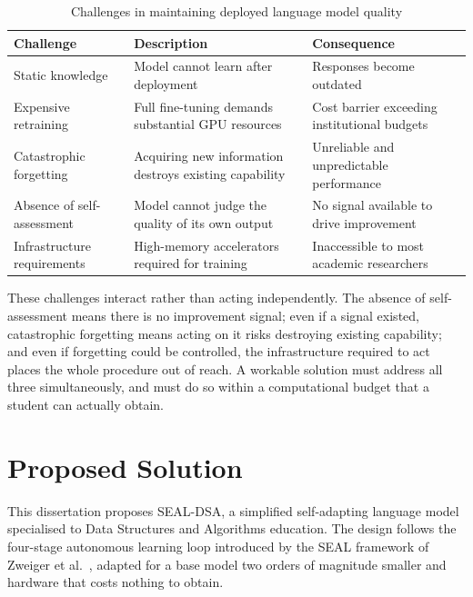 \documentclass[12pt,a4paper]{report}
\begin{document}
\begin{table}[htbp]
\centering
\caption{Challenges in maintaining deployed language model quality}
\begin{tabular}{>{\raggedright\arraybackslash}p{3cm} p{5cm} p{5cm}}
\toprule
\textbf{Challenge} & \textbf{Description} & \textbf{Consequence} \\
\midrule
Static knowledge & Model cannot learn after deployment & Responses become outdated \\
Expensive retraining & Full fine-tuning demands substantial GPU resources & Cost barrier exceeding institutional budgets \\
Catastrophic forgetting & Acquiring new information destroys existing capability & Unreliable and unpredictable performance \\
Absence of self-assessment & Model cannot judge the quality of its own output & No signal available to drive improvement \\
Infrastructure requirements & High-memory accelerators required for training & Inaccessible to most academic researchers \\
\bottomrule
\end{tabular}
\end{table}

These challenges interact rather than acting independently. The absence of self-assessment means there is no improvement signal; even if a signal existed, catastrophic forgetting means acting on it risks destroying existing capability; and even if forgetting could be controlled, the infrastructure required to act places the whole procedure out of reach. A workable solution must address all three simultaneously, and must do so within a computational budget that a student can actually obtain.

\section{Proposed Solution}

This dissertation proposes SEAL-DSA, a simplified self-adapting language model specialised to Data Structures and Algorithms education. The design follows the four-stage autonomous learning loop introduced by the SEAL framework of Zweiger et al.~\cite{mitseal}, adapted for a base model two orders of magnitude smaller and hardware that costs nothing to obtain.
\end{document}
